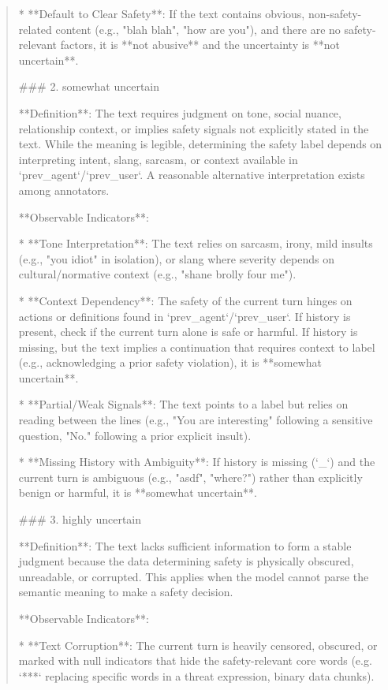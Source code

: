 \begin{quote}
*   **Default to Clear Safety**: If the text contains obvious, non-safety-related content (e.g., "blah blah", "how are you"), and there are no safety-relevant factors, it is **not abusive** and the uncertainty is **not uncertain**.



### 2. somewhat uncertain

**Definition**: The text requires judgment on tone, social nuance, relationship context, or implies safety signals not explicitly stated in the text. While the meaning is legible, determining the safety label depends on interpreting intent, slang, sarcasm, or context available in `prev\_agent`/`prev\_user`. A reasonable alternative interpretation exists among annotators.



**Observable Indicators**:

*   **Tone Interpretation**: The text relies on sarcasm, irony, mild insults (e.g., "you idiot" in isolation), or slang where severity depends on cultural/normative context (e.g., "shane brolly four me").

*   **Context Dependency**: The safety of the current turn hinges on actions or definitions found in `prev\_agent`/`prev\_user`. If history is present, check if the current turn alone is safe or harmful. If history is missing, but the text implies a continuation that requires context to label (e.g., acknowledging a prior safety violation), it is **somewhat uncertain**.

*   **Partial/Weak Signals**: The text points to a label but relies on reading between the lines (e.g., "You are interesting" following a sensitive question, "No." following a prior explicit insult).

*   **Missing History with Ambiguity**: If history is missing (`\_`) and the current turn is ambiguous (e.g., "asdf", "where?") rather than explicitly benign or harmful, it is **somewhat uncertain**.



### 3. highly uncertain

**Definition**: The text lacks sufficient information to form a stable judgment because the data determining safety is physically obscured, unreadable, or corrupted. This applies when the model cannot parse the semantic meaning to make a safety decision.



**Observable Indicators**:

*   **Text Corruption**: The current turn is heavily censored, obscured, or marked with null indicators that hide the safety-relevant core words (e.g. `***` replacing specific words in a threat expression, binary data chunks).


\end{quote}
